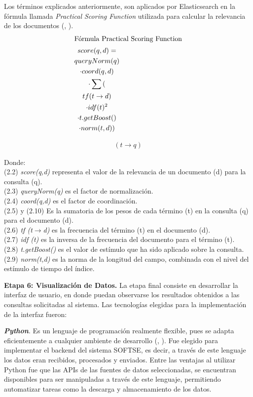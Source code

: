 Los términos explicados anteriormente, son aplicados por Elasticsearch en la fórmula llamada \textit{Practical Scoring Function} utilizada para calcular la relevancia de los documentos (\citeauthor{Gormley}, \citeyear{Gormley}).
\begin{gather}
\intertext{Fórmula Practical Scoring Function}
score( q,d) = \\
queryNorm(q) \\
\cdot coord(q,d) \\
\cdot \sum{}(\\
tf(t \to\mathbb{}d) \\
\cdot idf(t)^2 \\
\cdot t.getBoost()\\
\cdot norm(t,d))
\end{gather}

\begin{gather}
(t \to\mathbb{}q)
\end{gather}

Donde: \\
(2.2)  \textit{score(q,d)} representa el valor de la relevancia de un documento (d) para la consulta (q).\\
(2.3) \textit{queryNorm(q)} es el factor de normalización.\\
(2.4) \textit{coord(q,d)} es el factor de coordinación.\\
(2.5) y (2.10) Es la sumatoria de los pesos de cada término (t) en la consulta (q) para el documento (d).\\
(2.6) \textit{tf (t$ \to\mathbb{} $d)} es la frecuencia del término (t) en el documento (d).\\
(2.7) \textit{idf (t)} es la inversa de la frecuencia del documento para el término (t).\\
(2.8) \textit{t.getBoost()} es el valor de estímulo que ha sido aplicado sobre la consulta.\\
(2.9) \textit{norm(t,d)} es la norma de la longitud del campo, combinada con el nivel del estímulo de tiempo del índice.


\textbf{Etapa 6: Visualización de Datos.}
La etapa final consiste en desarrollar la interfaz de usuario, en donde puedan observarse los resultados obtenidos a las consultas solicitadas al sistema. Las tecnologías elegidas para la implementación de la interfaz fueron:

\textit{\textbf{Python}}. Es un lenguaje de programación realmente flexible, pues se adapta eficientemente a cualquier ambiente de desarrollo (\citeauthor{python}, \citeyear{python}). Fue elegido para implementar el backend del sistema SOFTSE, es decir, a través de este lenguaje los datos eran recibidos, procesados y enviados.
%
%
%
Entre las ventajas al utilizar Python fue que las APIs de las fuentes de datos seleccionadas, se encuentran disponibles para ser manipuladas a través de este lenguaje, permitiendo automatizar tareas como la descarga y almacenamiento de los datos.

